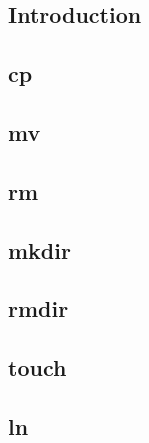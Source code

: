 
\subsection{Introduction}
 
\subsection{cp}

\subsection{mv}

\subsection{rm}

\subsection{mkdir}

\subsection{rmdir}

\subsection{touch}

\subsection{ln}

